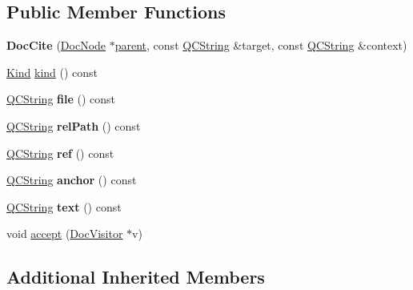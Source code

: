 \subsection*{Public Member Functions}
\begin{DoxyCompactItemize}
\item 
\mbox{\label{class_doc_cite_aba1aec0ac228dd1e707a5572fe199724}} 
{\bfseries Doc\+Cite} (\mbox{\hyperlink{class_doc_node}{Doc\+Node}} $\ast$\mbox{\hyperlink{class_doc_node_a73e8ad29a91cfceb0968eb00db71a23d}{parent}}, const \mbox{\hyperlink{class_q_c_string}{Q\+C\+String}} \&target, const \mbox{\hyperlink{class_q_c_string}{Q\+C\+String}} \&context)
\item 
\mbox{\hyperlink{class_doc_node_aebd16e89ca590d84cbd40543ea5faadb}{Kind}} \mbox{\hyperlink{class_doc_cite_a7f645fd99570ca0533c2e7087ae18bbd}{kind}} () const
\item 
\mbox{\label{class_doc_cite_ae842d125098f64d7ee7bb1b955f2f6ba}} 
\mbox{\hyperlink{class_q_c_string}{Q\+C\+String}} {\bfseries file} () const
\item 
\mbox{\label{class_doc_cite_a9d9d6c80250e7a9d18216a3eea4375ac}} 
\mbox{\hyperlink{class_q_c_string}{Q\+C\+String}} {\bfseries rel\+Path} () const
\item 
\mbox{\label{class_doc_cite_ae5f235deff96cbae64d906842654abea}} 
\mbox{\hyperlink{class_q_c_string}{Q\+C\+String}} {\bfseries ref} () const
\item 
\mbox{\label{class_doc_cite_acb79082b3765794abb193fcef75b1b2e}} 
\mbox{\hyperlink{class_q_c_string}{Q\+C\+String}} {\bfseries anchor} () const
\item 
\mbox{\label{class_doc_cite_a5be8286837be9a125d7de5769aea0142}} 
\mbox{\hyperlink{class_q_c_string}{Q\+C\+String}} {\bfseries text} () const
\item 
void \mbox{\hyperlink{class_doc_cite_a0f18374c2b9d937c71e317b9d36f1647}{accept}} (\mbox{\hyperlink{class_doc_visitor}{Doc\+Visitor}} $\ast$v)
\end{DoxyCompactItemize}
\subsection*{Additional Inherited Members}


